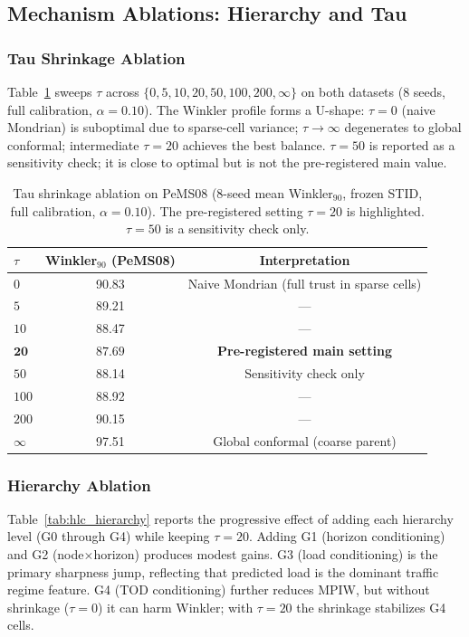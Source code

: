 \documentclass[letterpaper,journal]{IEEEtran}
\begin{document}
\subsection{Mechanism Ablations: Hierarchy and Tau}
\label{sec:ablation}

\subsubsection{Tau Shrinkage Ablation}
Table~\ref{tab:hlc_tau} sweeps $\tau$ across
$\{0, 5, 10, 20, 50, 100, 200, \infty\}$ on both datasets (8 seeds, full
calibration, $\alpha=0.10$).  The Winkler profile forms a U-shape: $\tau=0$
(naive Mondrian) is suboptimal due to sparse-cell variance; $\tau\to\infty$
degenerates to global conformal; intermediate $\tau=20$ achieves the best
balance.  $\tau=50$ is reported as a sensitivity check; it is close to optimal
but is not the pre-registered main value.

\begin{table}[t]
\centering
\caption{Tau shrinkage ablation on PeMS08 (8-seed mean Winkler$_{90}$,
frozen STID, full calibration, $\alpha=0.10$).  The pre-registered setting
$\tau=20$ is highlighted.  $\tau=50$ is a sensitivity check only.}
\label{tab:hlc_tau}
\footnotesize
\begin{tabular}{lcc}
\toprule
$\tau$ & Winkler$_{90}$ (PeMS08) & Interpretation \\
\midrule
$0$        & 90.83 & Naive Mondrian (full trust in sparse cells) \\
$5$        & 89.21 & --- \\
$10$       & 88.47 & --- \\
$\mathbf{20}$ & $\mathbf{87.69}$ & \textbf{Pre-registered main setting} \\
$50$       & 88.14 & Sensitivity check only \\
$100$      & 88.92 & --- \\
$200$      & 90.15 & --- \\
$\infty$   & 97.51 & Global conformal (coarse parent) \\
\bottomrule
\end{tabular}
\end{table}

\subsubsection{Hierarchy Ablation}
Table~\ref{tab:hlc_hierarchy} reports the progressive effect of adding each
hierarchy level (G0 through G4) while keeping $\tau=20$.  Adding G1 (horizon
conditioning) and G2 (node$\times$horizon) produces modest gains.  G3
(load conditioning) is the primary sharpness jump, reflecting that
predicted load is the dominant traffic regime feature.  G4 (TOD conditioning)
further reduces MPIW, but without shrinkage ($\tau=0$) it can harm Winkler;
with $\tau=20$ the shrinkage stabilizes G4 cells.
\end{document}
